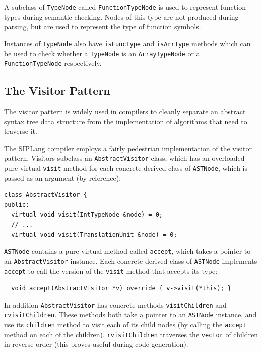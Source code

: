 \documentclass[11pt,a4paper]{scrartcl}
\begin{document}
A subclass of \verb!TypeNode! called \verb!FunctionTypeNode! is used to represent function types during semantic checking. Nodes of this type are not produced during parsing, but are used to represent the type of function symbols.

Instances of \verb!TypeNode! also have \verb!isFuncType! and \verb!isArrType! methods which can be used to check whether a \verb!TypeNode! is an \verb!ArrayTypeNode! or a \verb!FunctionTypeNode! respectively.

\subsection{The Visitor Pattern}

The visitor pattern is widely used in compilers to cleanly separate an abstract syntax tree data structure from the implementation of algorithms that need to traverse it.

The SIPLang compiler employs a fairly pedestrian implementation of the visitor pattern. Visitors subclass an \verb!AbstractVisitor! class, which has an overloaded pure virtual \verb!visit! method for each concrete derived class of \verb!ASTNode!, which is passed as an argument (by reference):

\begin{verbatim}
class AbstractVisitor {
public:
  virtual void visit(IntTypeNode &node) = 0;
  // ...
  virtual void visit(TranslationUnit &node) = 0;
\end{verbatim}

\verb!ASTNode! contains a pure virtual method called \verb!accept!, which takes a pointer to an \verb!AbstractVisitor! instance. Each concrete derived class of \verb!ASTNode! implements \verb!accept! to call the version of the \verb!visit! method that accepts its type:

\begin{verbatim}
  void accept(AbstractVisitor *v) override { v->visit(*this); }
\end{verbatim}

In addition \verb!AbstractVisitor! has concrete methods \verb!visitChildren! and \verb!rvisitChildren!. These methods both take a pointer to an \verb!ASTNode! instance, and use its \verb!children! method to visit each of its child nodes (by calling the \verb!accept! method on each of the children). \verb!rvisitChildren! traverses the \verb!vector! of children in reverse order (this proves useful during code generation).
\end{document}
